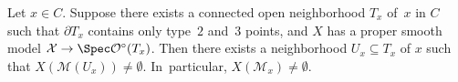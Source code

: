 \begin{thm} \label{1.5}
Let $x\in C$. Suppose there exists a connected open neighborhood $T_x$ of~$x$ in $C$ such that $\partial{T_x}$ contains only type~$2$ and~$3$ points, and $X$ has a proper smooth model ${\mathcal{X} \to \Spec \mathcal{O}^{\circ}(T_x)}$. Then there exists a neighborhood $U_x \subseteq T_x$ of $x$ such that ${X(\mathscr{M}(U_x)) \neq \emptyset}$. In~particular, $X(\mathscr{M}_x) \neq \emptyset$.
\end{thm}
